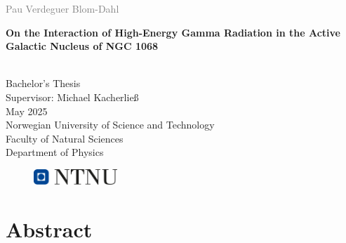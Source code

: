 \documentclass[a4paper, 12pt, oneside]{book} %
\begin{document}


\begin{titlepage}
\vspace*{1.5cm}

\noindent  \textcolor{gray}{\large Pau Verdeguer Blom-Dahl} \\
\vspace{1cm}

\noindent \textbf{\Large On the Interaction of High-Energy Gamma Radiation in the Active Galactic Nucleus of NGC 1068} \\
\vspace{0.5cm}

 \\


\vspace{7cm}
\noindent Bachelor's Thesis\\
Supervisor: Michael Kacherlie\ss \\
May 2025 \\

\vspace{0.2cm}
\noindent Norwegian University of Science and Technology \\
Faculty of Natural Sciences \\
Department of Physics \\

\begin{figure}[h]
    \includegraphics[width=0.28\textwidth]{Figures/ntnu_basic.png}
\end{figure}
\end{titlepage}


\chapter*{Abstract} %
\setcounter{page}{1}
\end{document}
